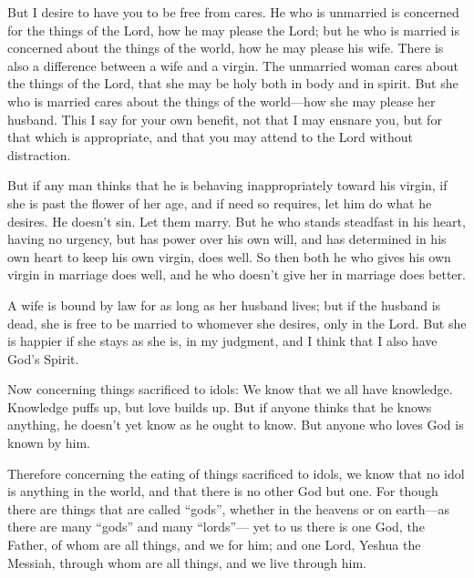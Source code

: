\myverse{}But I desire to have you to be free from cares. He who is unmarried
is concerned for the things of the Lord, how he may please the Lord;
\myverse{}but he who is married is concerned about the things of the world, how he may
please his wife.
\myverse{}There is also a difference between a wife and a virgin. The unmarried woman
cares about the things of the Lord, that she may be holy both in body and in spirit. But she who is married
cares about the things of the world—how she may please her husband.
\myverse{}This I say for your own benefit, not that I may ensnare you, but for that
which is appropriate, and that you may attend to the Lord without distraction.

\myverse{}But if any man thinks that he is behaving inappropriately toward
his virgin, if she is past the flower of her age, and if need so requires, let him do what he desires.
He doesn’t sin. Let them marry.
\myverse{}But he who stands steadfast in his heart, having no urgency, but has power
over his own will, and has determined in his own heart to keep his own virgin, does well.
\myverse{}So then both he who gives his own virgin in marriage does well, and he who
doesn’t give her in marriage does better.

\myverse{}A wife is bound by law for as long as her husband lives; but
if the husband is dead, she is free to be married to whomever she desires, only in the Lord.
\myverse{}But she is happier if she stays as she is, in my judgment, and I think that
I also have God’s Spirit.


\mychapter{} \myverse*{}Now concerning things sacrificed to idols: We know that we all
have knowledge. Knowledge puffs up, but love builds up.
\myverse{}But if anyone thinks that he knows anything, he doesn’t yet know as he ought
to know.
\myverse{}But anyone who loves God is known by him.

\myverse{}Therefore concerning the eating of things sacrificed to idols,
we know that no idol is anything in the world, and that there is no other God but one.
\myverse{}For though there are things that are called “gods”, whether in the heavens or
on earth—as there are many “gods” and many “lords”—
\myverse{}yet to us there is one God, the Father, of whom are all things, and we for him;
and one Lord, Yeshua the Messiah, through whom are all things, and we live through him.

